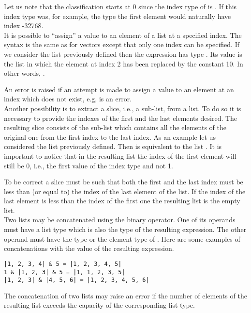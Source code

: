 Let us note that the classification starts at 0 since the index type
of  is .  If this index type was, for example,
the type  the first element would naturally have index
-32768.\\

 It is possible to
``assign'' a value to an element of a list at a specified index.  The
syntax is the same as for vectors except that only one index can be
specified.  If we consider the list  previously defined then the
expression  has type .  Its value is
the list  in which the element at index 2 has been replaced by
the constant 10.  In other words, .

An error is raised if an attempt is made to assign a value to an
element at an index which does not exist, e.g, 
is an error.\\

 Another possibility is to
extract a slice, i.e., a sub-list, from a list.  To do so it is
necessary to provide the indexes of the first and the last elements
desired.  The resulting slice consists of the sub-list which contains
all the elements of the original one from the first index to the last
index.  As an example let us considered the list  previously
defined.  Then  is equivalent to the list .  It is important to notice that in the resulting list
the index of the first element will still be 0, i.e., the first value
of the index type  and not 1.

To be correct a slice must be such that both the first and the last
index must be less than (or equal to) the index of the last element of
the list.  If the index of the last element is less than the index of
the first one the resulting list is the empty list.\\

 Two lists may be
concatenated using the binary \LS{&} operator.  One of its operands
must have a list type  which is also the type of the resulting
expression.  The other operand must have the type  or the
element type of .  Here are some examples of concatenations with
the value of the resulting expression.
\begin{lstlisting}
|1, 2, 3, 4| & 5 = |1, 2, 3, 4, 5|
1 & |1, 2, 3| & 5 = |1, 1, 2, 3, 5|
|1, 2, 3| & |4, 5, 6| = |1, 2, 3, 4, 5, 6|
\end{lstlisting}
The concatenation of two lists may raise an error if the number of elements of
the resulting list exceeds the capacity of the corresponding list type.\\

